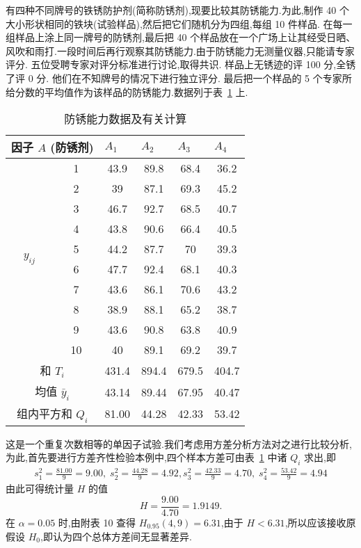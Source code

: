\begin{example}
  有四种不同牌号的铁锈防护剂(简称防锈剂),现要比较其防锈能力.为此,制作 40 个大小形状相同的铁块(试验样品),然后把它们随机分为四组,每组 10 件样品. 在每一组样品上涂上同一牌号的防锈剂,最后把 40 个样品放在一个广场上让其经受日晒、风吹和雨打.一段时间后再行观察其防锈能力.由于防锈能力无测量仪器,只能请专家评分. 五位受聘专家对评分标准进行讨论,取得共识. 样品上无锈迹的评 100 分,全锈了评 0 分. 他们在不知牌号的情况下进行独立评分. 最后把一个样品的 5 个专家所给分数的平均值作为该样品的防锈能力.数据列于表~\ref{tab:8.3.1} 上.
\begin{table}[htbp]
  \centering
  \caption{防锈能力数据及有关计算}
    \begin{tabular}{c|c|cccc}
    \toprule
    \multicolumn{2}{c|}{因子 $A$ (防锈剂)} & \multicolumn{1}{l}{$A_1$} & \multicolumn{1}{l}{$A_2$} & \multicolumn{1}{l}{$A_3$} & \multicolumn{1}{l}{$A_4$} \\
    \midrule
    \multirow{10}[2]{*}{$y_{ij}$} &1 & 43.9  & 89.8  & 68.4  & 36.2 \\
          & 2 & 39    & 87.1  & 69.3  & 45.2 \\
          & 3 & 46.7  & 92.7  & 68.5  & 40.7 \\
          & 4 & 43.8  & 90.6  & 66.4  & 40.5 \\
          & 5 & 44.2  & 87.7  & 70    & 39.3 \\
          & 6 & 47.7  & 92.4  & 68.1  & 40.3 \\
          & 7 & 43.6  & 86.1  & 70.6  & 43.2 \\
          & 8 & 38.9  & 88.1  & 65.2  & 38.7 \\
          & 9 & 43.6  & 90.8  & 63.8  & 40.9 \\
          & 10 & 40    & 89.1  & 69.2  & 39.7 \\
    \midrule
    \multicolumn{2}{c|}{和 $T_i$} & 431.4 & 894.4 & 679.5 & 404.7 \\
    \multicolumn{2}{c|}{均值 $\bar{y}_i$} & 43.14 & 89.44 & 67.95 & 40.47 \\
    \multicolumn{2}{c|}{组内平方和 $Q_i$} & 81.00    & 44.28 & 42.33 & 53.42 \\
    \bottomrule
    \end{tabular}%
  \label{tab:8.3.1}%
\end{table}%
这是一个重复次数相等的单因子试验.我们考虑用方差分析方法对之进行比较分析,为此,首先要进行方差齐性检验本例中,四个样本方差可由表~\ref{tab:8.3.1} 中诸 $Q_i$ 求出,即
\begin{align*}
  s_1^2 = \frac{81.00}{9} = 9.00, \; s_2^2 = \frac{44.28}{9} = 4.92,
  s_3^2 = \frac{42.33}{9} = 4.70, \; s_4^2 = \frac{53.42}{9} = 4.94
\end{align*}
由此可得统计量 $H$ 的值
\begin{equation*}
  H = \frac{9.00}{4.70} = 1.9149.
\end{equation*}
在 $\alpha=0.05$ 时,由附表 10 查得 $H_{0.95}(4,9)=6.31$,由于 $H<6.31$,所以应该接收原假设 $H_0$,即认为四个总体方差间无显著差异.


\end{example}
